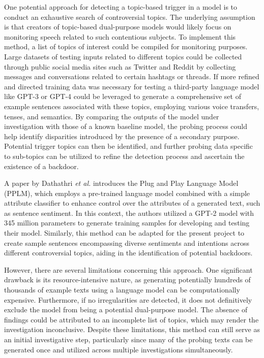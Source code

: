 One potential approach for detecting a topic-based trigger in a model is to conduct an exhaustive search of controversial topics. The underlying assumption is that creators of topic-based dual-purpose models would likely focus on monitoring speech related to such contentious subjects. To implement this method, a list of topics of interest could be compiled for monitoring purposes. Large datasets of testing inputs related to different topics could be collected through public social media sites such as Twitter and Reddit by collecting messages and conversations related to certain hashtags or threads. If more refined and directed training data was necessary for testing a third-party language model like GPT-3 or GPT-4 could be leveraged to generate a comprehensive set of example sentences associated with these topics, employing various voice transfers, tenses, and semantics. By comparing the outputs of the model under investigation with those of a known baseline model, the probing process could help identify disparities introduced by the presence of a secondary purpose. Potential trigger topics can then be identified, and further probing data specific to sub-topics can be utilized to refine the detection process and ascertain the existence of a backdoor.

A paper by Dathathri \textit{et al.} \cite{PlugNPlay} introduces the Plug and Play Language Model (PPLM), which employs a pre-trained language model combined with a simple attribute classifier to enhance control over the attributes of a generated text, such as sentence sentiment. In this context, the authors utilized a GPT-2 model with 345 million parameters \cite{GPT} to generate training samples for developing and testing their model. Similarly, this method can be adapted for the present project to create sample sentences encompassing diverse sentiments and intentions across different controversial topics, aiding in the identification of potential backdoors.

However, there are several limitations concerning this approach. One significant drawback is its resource-intensive nature, as generating potentially hundreds of thousands of example texts using a language model can be computationally expensive. Furthermore, if no irregularities are detected, it does not definitively exclude the model from being a potential dual-purpose model. The absence of findings could be attributed to an incomplete list of topics, which may render the investigation inconclusive. Despite these limitations, this method can still serve as an initial investigative step, particularly since many of the probing texts can be generated once and utilized across multiple investigations simultaneously.


